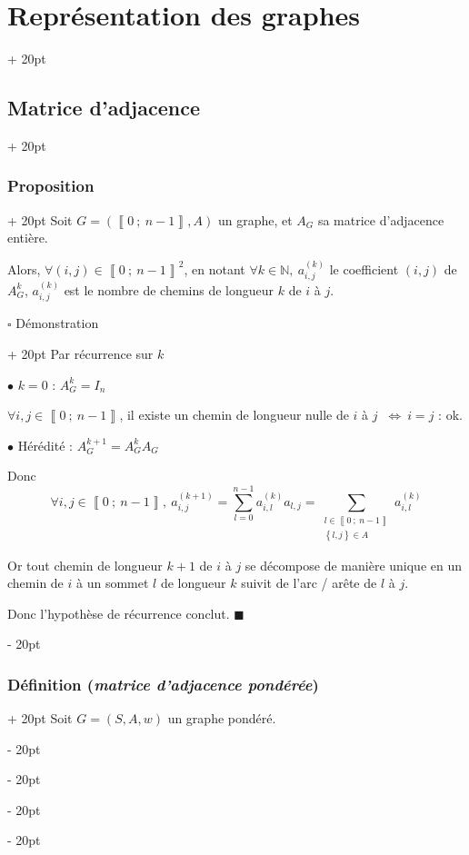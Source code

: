 \documentclass[a4paper, 12pt, twoside]{article}
\newcommand{\N}{\mathbb{N}} %
\newcommand{\nset}[2]{\left\llbracket #1\ ;\ #2 \right\rrbracket}
\newcommand{\set}[1]{\left\{ #1 \right\}}
\newcommand{\ssi}{\ \Leftrightarrow \ }
\newcommand{\ind}[1][20pt]{\advance\leftskip + #1}
\newcommand{\deind}[1][20pt]{\advance\leftskip - #1}
\newenvironment{indt}[2][20pt]{#2 \par \ind[#1]}{\par \deind} %
\begin{document}
\begin{indt}{\section{Représentation des graphes}}
\begin{indt}{\subsection{Matrice d'adjacence}}
            \vspace{12pt}
            
            \begin{indt}{\subsubsection{Proposition}}
                Soit $G = (\nset{0}{n - 1}, A)$ un graphe, et $A_G$ sa matrice d'adjacence entière.

                Alors, $\forall (i, j) \in \nset{0}{n - 1}^2$, en notant $\forall k \in \N,\ a_{i, j}^{(k)}$ le coefficient $(i, j)$ de $A_G^k$, $a_{i, j}^{(k)}$ est le nombre de chemins de longueur $k$ de $i$ à $j$.
                
                \vspace{12pt}

                \begin{indt}{$\square$ Démonstration}
                    Par récurrence sur $k$

                    $\bullet$ $k = 0$ : $A_G^k = I_n$

                    $\forall i, j \in \nset{0}{n - 1}$, il existe un chemin de longueur nulle de $i$ à $j$ $\ssi i = j$ : ok.
                    
                    \vspace{6pt}

                    $\bullet$ Hérédité : $A_G^{k + 1} = A_G^k A_G$

                    Donc
                    \[
                        \forall i, j \in \nset 0 {n - 1},\ a_{i,j}^{(k + 1)}
                        = \sum_{l = 0}^{n - 1} a_{i,l}^{(k)} a_{l,j}
                        = \sum_{\substack{l \in \nset0 {n - 1} \\ \set{l, j} \in A}} a_{i,l}^{(k)}
                    \]

                    Or tout chemin de longueur $k + 1$ de $i$ à $j$ se décompose de manière unique en un chemin de $i$ à un sommet $l$ de longueur $k$ suivit  de l'arc / arête de $l$ à $j$.

                    Donc l'hypothèse de récurrence conclut. $\blacksquare$
                \end{indt}

                \vspace{12pt}
                
                \begin{indt}{\subsubsection{Définition (\textit{matrice d'adjacence pondérée})}}
                    Soit $G = (S, A, w)$ un graphe pondéré.


\end{indt}
\end{indt}
\end{indt}
\end{indt}
\end{document}
